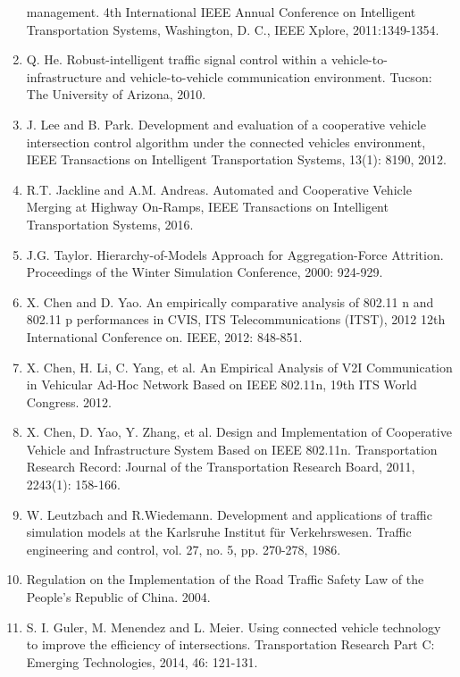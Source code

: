 \begin{enumerate}
  management. 4th International IEEE Annual Conference on Intelligent
  Transportation Systems, Washington, D. C., IEEE Xplore,
  2011:1349-1354.
\item
  Q. He. Robust-intelligent traffic signal control within a
  vehicle-to-infrastructure and vehicle-to-vehicle communication
  environment. Tucson: The University of Arizona, 2010.
\item
  J. Lee and B. Park. Development and evaluation of a cooperative
  vehicle intersection control algorithm under the connected vehicles
  environment, IEEE Transactions on Intelligent Transportation Systems,
  13(1): 8190, 2012.
\item
  R.T. Jackline and A.M. Andreas. Automated and Cooperative Vehicle
  Merging at Highway On-Ramps, IEEE Transactions on Intelligent
  Transportation Systems, 2016.
\item
  J.G. Taylor. Hierarchy-of-Models Approach for Aggregation-Force
  Attrition. Proceedings of the Winter Simulation Conference, 2000:
  924-929.
\item
  X. Chen and D. Yao. An empirically comparative analysis of 802.11 n
  and 802.11 p performances in CVIS, ITS Telecommunications (ITST), 2012
  12th International Conference on. IEEE, 2012: 848-851.
\item
  X. Chen, H. Li, C. Yang, et al. An Empirical Analysis of V2I
  Communication in Vehicular Ad-Hoc Network Based on IEEE 802.11n, 19th
  ITS World Congress. 2012.
\item
  X. Chen, D. Yao, Y. Zhang, et al. Design and Implementation of
  Cooperative Vehicle and Infrastructure System Based on IEEE 802.11n.
  Transportation Research Record: Journal of the Transportation Research
  Board, 2011, 2243(1): 158-166.
\item
  W. Leutzbach and R.Wiedemann. Development and applications of traffic
  simulation models at the Karlsruhe Institut für Verkehrswesen. Traffic
  engineering and control, vol. 27, no. 5, pp. 270-278, 1986.
\item
  Regulation on the Implementation of the Road Traffic Safety Law of the
  People's Republic of China. 2004.
\item
  S. I. Guler, M. Menendez and L. Meier. Using connected vehicle
  technology to improve the efficiency of intersections. Transportation
  Research Part C: Emerging Technologies, 2014, 46: 121-131.
\end{enumerate}
